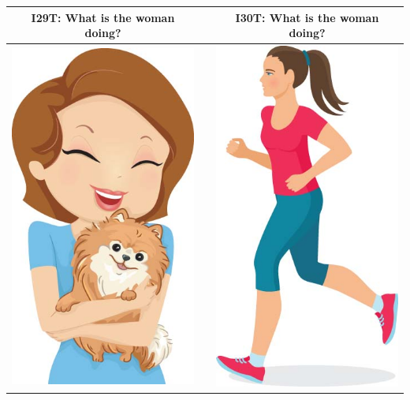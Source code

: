 \documentclass[12pt,notitlepage]{article}
\begin{document}
\begin{center}
\begin{tabular}{|c|c|c|}
\hline
I29T: What is the woman doing? && I30T: What is the woman doing? \\
\hline
\includegraphics[width=20em,trim=0 0 0 -3]{figures/I29.jpg} & & \includegraphics[width=20em,trim=0 0 0 -3]{figures/I30.jpg} \\
\hline
\end{tabular}


\end{center}
\end{document}
